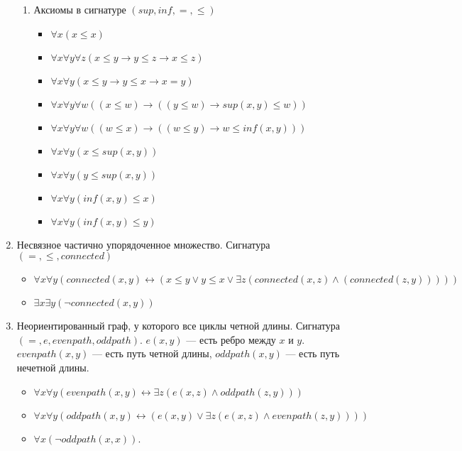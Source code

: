 \documentclass[10pt]{article}
\renewcommand{\iff}{\leftrightarrow}
\begin{document}
\begin{enumerate}
\begin{enumerate}
	
	\item Аксиомы в сигнатуре $(sup, inf, =, \le)$
	\begin{itemize}
		\item $\forall x (x\le x)$
		\item $\forall x \forall y \forall z (x \le y \to y\le z \to x \le z)$
		\item $\forall x \forall y (x\le y \to y\le x \to x=y)$
		\item $\forall x \forall y \forall w ( (x\le w) \to ((y\le w)\to sup(x, y) \le w))$
		\item $\forall x \forall y \forall w ((w \le x) \to ((w \le y) \to w\le inf(x, y)))$
		\item $\forall x \forall y (x \le sup(x, y))$
		\item $\forall x \forall y (y \le sup(x, y))$
		\item $\forall x \forall y (inf(x, y) \le x)$
		\item $\forall x \forall y (inf(x, y) \le y)$
	\end{itemize}
\end{enumerate}
\item Несвязное частично упорядоченное множество. Сигнатура $(=, \le,  connected)$
	\begin{itemize}
		\item $\forall x \forall y (connected(x, y) \iff (x \le y \lor y \le x \lor \exists z (connected(x, z) \land (connected(z, y)))))$
		\item $\exists x \exists y (\lnot connected(x, y))$
	\end{itemize}


\item Неориентированный граф, у которого все циклы четной длины. Сигнатура $(=, e, evenpath, oddpath)$. $e(x, y)$ --- есть ребро между $x$ и $y$. $evenpath(x, y)$ --- есть путь четной длины, $oddpath(x, y)$ --- есть путь нечетной длины.
	\begin{itemize}
		\item $\forall x \forall y(evenpath(x, y) \iff \exists z ( e(x, z) \land oddpath(z, y)))$
		\item $\forall x \forall y(oddpath(x, y) \iff (e(x, y) \lor \exists z (e(x, z) \land evenpath(z, y))))$
		\item $\forall x (\lnot oddpath(x, x))$.
	\end{itemize}
	
\end{enumerate}
\end{document}
